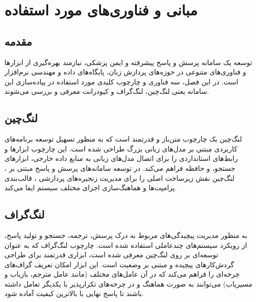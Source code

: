 \chapter{مبانی و فناوری‌های مورد استفاده}
\thispagestyle{empty}

\section{مقدمه}
توسعه یک سامانه پرسش و پاسخ پیشرفته و ایمن پزشکی، نیازمند بهره‌گیری از ابزارها و فناوری‌های متنوعی در حوزه‌های پردازش زبان، پایگاه‌های داده و مهندسی نرم‌افزار است. در این فصل، سه فناوری و چارچوب کلیدی مورد استفاده در پیاده‌سازی این سامانه یعنی لنگ‌چین، لنگ‌گراف و کیودرانت معرفی و بررسی می‌شوند.

\section{لنگ‌چین }
لنگ‌چین یک چارچوب متن‌باز و قدرتمند است که به منظور تسهیل توسعه برنامه‌های کاربردی مبتنی بر مدل‌های زبانی بزرگ طراحی شده است. این چارچوب ابزارها و رابط‌های استانداردی را برای اتصال مدل‌های زبانی به منابع داده خارجی، ابزارهای جستجو، و حافظه فراهم می‌کند. در توسعه سامانه‌های پرسش و پاسخ مبتنی بر ، لنگ‌چین نقش زیرساخت اصلی را برای مدیریت زنجیره‌های پردازشی ، قالب‌بندی پرامپت‌ها و هماهنگ‌سازی اجزای مختلف سیستم ایفا می‌کند.

\section{لنگ‌گراف }
به منظور مدیریت پیچیدگی‌های مربوط به درک پرسش، ترجمه، جستجو و تولید پاسخ، از رویکرد سیستم‌های چندعاملی  استفاده شده است. چارچوب لنگ‌گراف که به عنوان توسعه‌ای بر روی لنگ‌چین معرفی شده است، ابزاری قدرتمند برای طراحی گردش‌کارهای پیچیده و مبتنی بر وضعیت  است. این ابزار امکان تعریف گراف‌های چرخه‌ای را فراهم می‌کند که در آن عامل‌های مختلف (مانند عامل مترجم، بازیاب و مسیر‌یاب) می‌توانند به صورت هماهنگ و در چرخه‌های تکرارپذیر با یکدیگر تعامل داشته باشند تا پاسخ نهایی با بالاترین کیفیت آماده شود.

